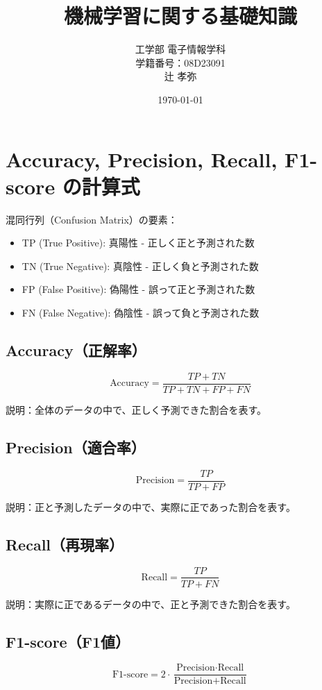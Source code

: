 \documentclass[a4paper,11pt]{article}
\title{機械学習に関する基礎知識}
\author{工学部 電子情報学科\\学籍番号：08D23091\\辻 孝弥}
\date{\today}
\begin{document}
\maketitle


\section{Accuracy, Precision, Recall, F1-score の計算式}

混同行列（Confusion Matrix）の要素：
\begin{itemize}
    \item TP (True Positive): 真陽性 - 正しく正と予測された数
    \item TN (True Negative): 真陰性 - 正しく負と予測された数
    \item FP (False Positive): 偽陽性 - 誤って正と予測された数
    \item FN (False Negative): 偽陰性 - 誤って負と予測された数
\end{itemize}

\subsection{Accuracy（正解率）}
\begin{equation}
    \text{Accuracy} = \frac{TP + TN}{TP + TN + FP + FN}
\end{equation}

説明：全体のデータの中で、正しく予測できた割合を表す。

\subsection{Precision（適合率）}
\begin{equation}
    \text{Precision} = \frac{TP}{TP + FP}
\end{equation}

説明：正と予測したデータの中で、実際に正であった割合を表す。

\subsection{Recall（再現率）}
\begin{equation}
    \text{Recall} = \frac{TP}{TP + FN}
\end{equation}

説明：実際に正であるデータの中で、正と予測できた割合を表す。

\subsection{F1-score（F1値）}
\begin{equation}
    \text{F1-score} = 2 \cdot \frac{\text{Precision} \cdot \text{Recall}}{\text{Precision} + \text{Recall}}
\end{equation}
\end{document}
